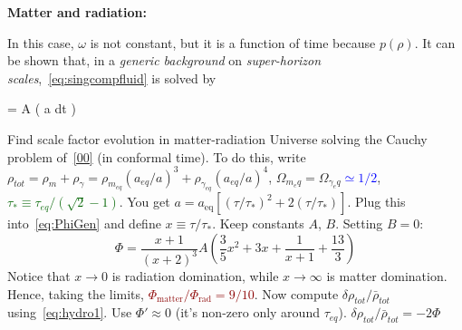 \begin{mycolorbox}
    \textbf{Matter and radiation:} 
    
    In this case, $\omega$ is not constant, but it is a function of time because $p(\rho)$. It can be shown that, in a \textit{generic background} on \textit{super-horizon scales},~\eqref{eq:singcompfluid} is solved by
    \begin{eqopt}[darkred]\label{eq:PhiGen}
     \Phi = A  \left(  \int a dt \right)
    \end{eqopt}
    Find scale factor evolution in matter-radiation Universe solving the Cauchy problem of~\eqref{00} (in conformal time). To do this, write $\rho_{tot}=\rho_m+\rho_\gamma= \rho_{m_{eq}}(a_{eq}/a)^3+\rho_{\gamma_{eq}}(a_{eq}/a)^4$, $\Omega_{m_eq}=\Omega_{\gamma_eq}$\textcolor{blue}{$\simeq 1/2$}, \textcolor{darkgreen}{$\tau_*\equiv \tau_{eq}/(\sqrt{2}-1)$}.
    You get $ a = a_{\mathrm{eq}}\!\left[\left(\tau/\tau_{*}\right)^{2}
      + 2\left(\tau/\tau_{*}\right)\right]$.
    Plug this into~\eqref{eq:PhiGen} and define $x\equiv \tau/\tau_*$. Keep constants $A$, $B$. Setting $B=0$:
    \begin{equation}
        \Phi = \frac{x + 1}{(x + 2)^{3}}
         A\!\left(\frac{3}{5}x^{2} + 3x + \frac{1}{x + 1} + \frac{13}{3}\right)  
    \end{equation}
    Notice that $x \rightarrow 0$ is radiation domination, while $x\rightarrow \infty$ is matter domination. 
    Hence, taking the limits, \textcolor{darkred}{$\Phi_{\mathrm{matter}}/\Phi_{\mathrm{rad}} = 9/10$}.
    Now compute $\delta \rho_{tot}/ \bar{\rho}_{tot}$ using~\eqref{eq:hydro1}. Use $\Phi'\approx 0$ (it's non-zero only around $\tau_{eq}$). $\delta \rho_{tot}/ \bar{\rho}_{tot}=-2\Phi$
\end{mycolorbox}

    

    